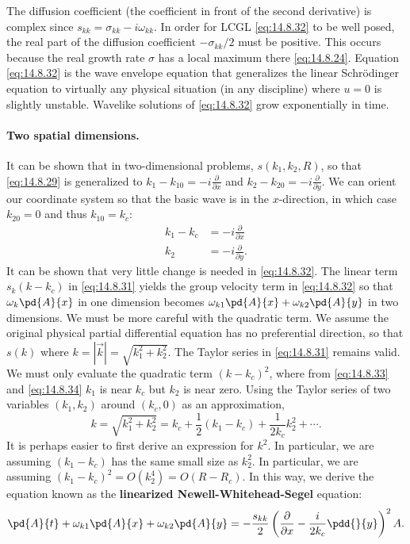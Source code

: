 The diffusion coefficient (the coefficient in front of the second derivative) is complex since $s_{kk} = \sigma_{kk} - i\omega_{kk}$. In order for LCGL \eqref{eq:14.8.32} to be well posed, the real part of the diffusion coefficient $-\sigma_{kk}/2$ must be positive. This occurs because the real growth rate $\sigma$ has a local maximum there \eqref{eq:14.8.24}. Equation \eqref{eq:14.8.32} is the wave envelope equation that generalizes the linear Schr\"odinger equation to virtually any physical situation (in any discipline) where $u = 0$ is slightly unstable. Wavelike solutions of \eqref{eq:14.8.32} grow exponentially in time.

\paragraph{Two spatial dimensions.}
It can be shown that in two-dimensional problems, $s(k_1, k_2, R)$, so that \eqref{eq:14.8.29} is generalized to $k_1 - k_{10} = -i\frac{\partial}{\partial x}$ and $k_2 - k_{20} = -i\frac{\partial}{\partial y}$. We can orient our coordinate system so that the basic wave is in the $x$-direction, in which case $k_{20} = 0$ and thus $k_{10} = k_c$:
\begin{align}
k_1 - k_c &= -i\frac{\partial}{\partial x} \label{eq:14.8.33} \\
k_2 &= -i\frac{\partial}{\partial y}. \label{eq:14.8.34}
\end{align}
It can be shown that very little change is needed in \eqref{eq:14.8.32}. The linear term $s_k(k-k_c)$ in \eqref{eq:14.8.31} yields the group velocity term in \eqref{eq:14.8.32} so that $\omega_k\pd{A}{x}$ in one dimension becomes $\omega_{k1}\pd{A}{x} + \omega_{k2}\pd{A}{y}$ in two dimensions. We must be more careful with the quadratic term. We assume the original physical partial differential equation has no preferential direction, so that $s(k)$ where $k = |\vec{k}| = \sqrt{k_1^2 + k_2^2}$. The Taylor series in \eqref{eq:14.8.31} remains valid. We must only evaluate the quadratic term $(k - k_c)^2$, where from \eqref{eq:14.8.33} and \eqref{eq:14.8.34} $k_1$ is near $k_c$ but $k_2$ is near zero. Using the Taylor series of two variables $(k_1, k_2)$ around $(k_c, 0)$ as an approximation,
\[
k = \sqrt{k_1^2 + k_2^2} = k_c + \frac{1}{2}(k_1 - k_c) + \frac{1}{2k_c}k_2^2 + \cdots.
\]
It is perhaps easier to first derive an expression for $k^2$. In particular, we are assuming $(k_1 - k_c)$ has the same small size as $k_2^2$. In particular, we are assuming $(k_1 - k_c)^2 = O(k_2^4) = O(R - R_c)$. In this way, we derive the equation known as the \textbf{linearized Newell-Whitehead-Segel} equation:
\begin{equation}
\pd{A}{t} + \omega_{k1}\pd{A}{x} + \omega_{k2}\pd{A}{y} = -\frac{s_{kk}}{2}\left(\frac{\partial}{\partial x} - \frac{i}{2k_c}\pdd{}{y}\right)^2 A.
\label{eq:14.8.35}
\end{equation}

